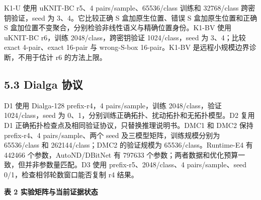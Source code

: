 \documentclass[
  a4paper,
  UTF8]{ctexart}
\begin{document}
K1-U 使用 uKNIT-BC r5、4 pairs/sample、65536/class 训练和 32768/class
跨密钥验证，seed 为 3、4。它比较正确 S 盒加原生位置、错误 S
盒加原生位置和正确 S
盒加位置不变聚合，分别检验非线性语义与精确位置身份。K1-BV 使用 uKNIT-BC
r6，训练 2048/class，跨密钥验证 1024/class，seed 为 3、4；比较 exact
4-pair、exact 16-pair 与 wrong-S-box 16-pair。K1-BV
是远程小规模边界诊断，不用于估计 r6 的方法上限。

\hypertarget{dialga-ux534fux8bae}{%
\subsection{5.3 Dialga 协议}\label{dialga-ux534fux8bae}}

D1 使用 Dialga-128 prefix-r4，4 pairs/sample，训练 2048/class，验证
1024/class，seed 为 0、1，分别训练正确拓扑、扰动拓扑和无拓扑模型。D2
复用 D1 正确拓扑检查点及相同验证协议，只替换推理说明书。DMC1 和 DMC2
保持 prefix-r4、4 pairs/sample、两个 seed 及三模型矩阵，训练规模分别为
65536/class 和 262144/class；DMC2 的验证规模为 65536/class。Runtime-E4
有 442466 个参数，AutoND/DBitNet 有 797633
个参数；两者数据和优化预算一致，但并非参数量匹配。D3 使用
prefix-r5、2048/class、4 pairs/sample、seed
0/1，检查相邻轮数窗口能否复制 r4 结果。

\textbf{表 2 实验矩阵与当前证据状态}
\end{document}
